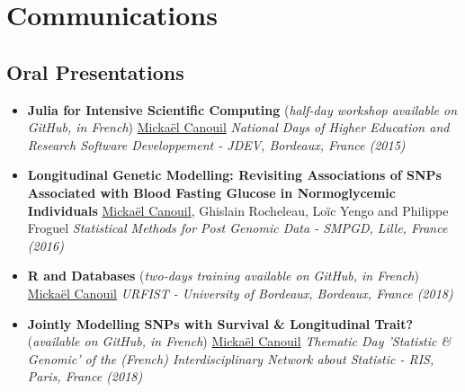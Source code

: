 \documentclass[11pt,a4paper,sans]{moderncv}
\begin{document}
\section{Communications}
\subsection{Oral Presentations}
\begin{itemize}
    \setlength{\itemsep}{0.5em}

    \item \textbf{Julia for Intensive Scientific Computing} (\textit{half-day workshop available on GitHub, in French})
        \newline \underline{Mickaël Canouil}
        \newline \textit{National Days of Higher Education and Research Software Developpement - JDEV, Bordeaux, France (2015)}

    \item \textbf{Longitudinal Genetic Modelling: Revisiting Associations of SNPs Associated with Blood Fasting Glucose in Normoglycemic Individuals}
        \newline \underline{Mickaël Canouil}, Ghislain Rocheleau, Loïc Yengo and Philippe Froguel
        \newline \textit{Statistical Methods for Post Genomic Data - SMPGD, Lille, France (2016)}
    
    \item \textbf{R and Databases} (\textit{two-days training available on GitHub, in French})
        \newline \underline{Mickaël Canouil}
        \newline \textit{URFIST - University of Bordeaux, Bordeaux, France (2018)}
        
    \item \textbf{Jointly Modelling SNPs with Survival \& Longitudinal Trait?} (\textit{available on GitHub, in French})
        \newline \underline{Mickaël Canouil}
        \newline \textit{Thematic Day 'Statistic \& Genomic' of the (French) Interdisciplinary Network about Statistic - RIS, Paris, France (2018)}

\end{itemize}
\end{document}
